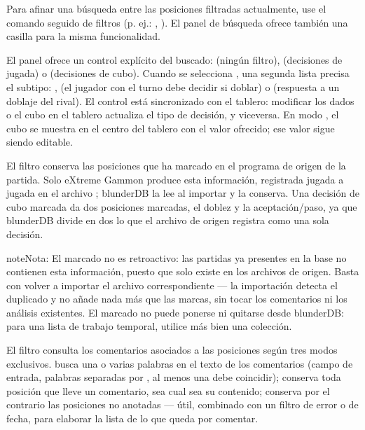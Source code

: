 \documentclass[letterpaper,10pt,spanish]{sphinxmanual}
\begin{document}
\sphinxAtStartPar
Para afinar una búsqueda entre las posiciones filtradas actualmente, use el comando  seguido de filtros (p. ej.: , ). El panel de búsqueda ofrece también una casilla  para la misma funcionalidad.

\sphinxAtStartPar
El panel ofrece un control explícito del  buscado:  (ningún filtro),  (decisiones de jugada) o  (decisiones de cubo). Cuando se selecciona , una segunda lista precisa el subtipo: ,  (el jugador con el turno debe decidir si doblar) o  (respuesta a un doblaje del rival). El control está sincronizado con el tablero: modificar los dados o el cubo en el tablero actualiza el tipo de decisión, y viceversa. En modo , el cubo se muestra en el centro del tablero con el valor ofrecido; ese valor sigue siendo editable.

\sphinxAtStartPar
El filtro  conserva las posiciones que ha marcado en el programa de origen de la partida. Solo eXtreme Gammon produce esta información, registrada jugada a jugada en el archivo ; blunderDB la lee al importar y la conserva. Una decisión de cubo marcada da dos posiciones marcadas, el doblez y la aceptación/paso, ya que blunderDB divide en dos lo que el archivo de origen registra como una sola decisión.

\begin{sphinxadmonition}{note}{Nota:}
\sphinxAtStartPar
El marcado no es retroactivo: las partidas ya presentes en la base no contienen esta información, puesto que solo existe en los archivos de origen. Basta con volver a importar el archivo  correspondiente — la importación detecta el duplicado y no añade nada más que las marcas, sin tocar los comentarios ni los análisis existentes. El marcado no puede ponerse ni quitarse desde blunderDB: para una lista de trabajo temporal, utilice más bien una colección.
\end{sphinxadmonition}

\sphinxAtStartPar
El filtro  consulta los comentarios asociados a las posiciones según tres modos exclusivos.  busca una o varias palabras en el texto de los comentarios (campo de entrada, palabras separadas por \sphinxcode{\sphinxupquote{;}}, al menos una debe coincidir);  conserva toda posición que lleve un comentario, sea cual sea su contenido;  conserva por el contrario las posiciones no anotadas — útil, combinado con un filtro de error o de fecha, para elaborar la lista de lo que queda por comentar.
\end{document}
